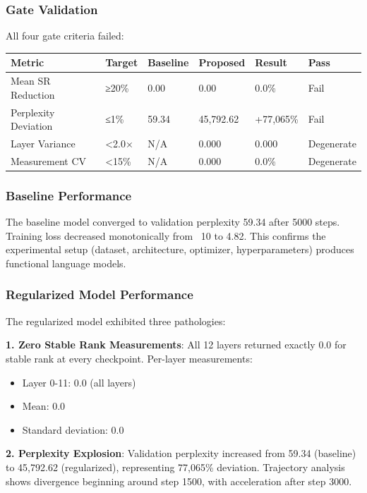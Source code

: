 
\subsubsection{Gate Validation}

All four gate criteria failed:

\begin{table}[htbp]
\centering
\begin{tabular}{llllll}
\toprule
Metric & Target & Baseline & Proposed & Result & Pass \\
\midrule
Mean SR Reduction & ≥20\% & 0.00 & 0.00 & 0.0\% & Fail \\
Perplexity Deviation & ≤1\% & 59.34 & 45,792.62 & +77,065\% & Fail \\
Layer Variance & <2.0× & N/A & 0.000 & 0.000 & Degenerate \\
Measurement CV & <15\% & N/A & 0.000 & 0.0\% & Degenerate \\
\bottomrule
\end{tabular}
\end{table}

\subsubsection{Baseline Performance}

The baseline model converged to validation perplexity 59.34 after 5000 steps. Training loss decreased monotonically from ~10 to 4.82. This confirms the experimental setup (dataset, architecture, optimizer, hyperparameters) produces functional language models.

\subsubsection{Regularized Model Performance}

The regularized model exhibited three pathologies:

\textbf{1. Zero Stable Rank Measurements}: All 12 layers returned exactly 0.0 for stable rank at every checkpoint. Per-layer measurements:
\begin{itemize}
\item Layer 0-11: 0.0 (all layers)
\item Mean: 0.0
\item Standard deviation: 0.0
\end{itemize}

\textbf{2. Perplexity Explosion}: Validation perplexity increased from 59.34 (baseline) to 45,792.62 (regularized), representing 77,065\% deviation. Trajectory analysis shows divergence beginning around step 1500, with acceleration after step 3000.

